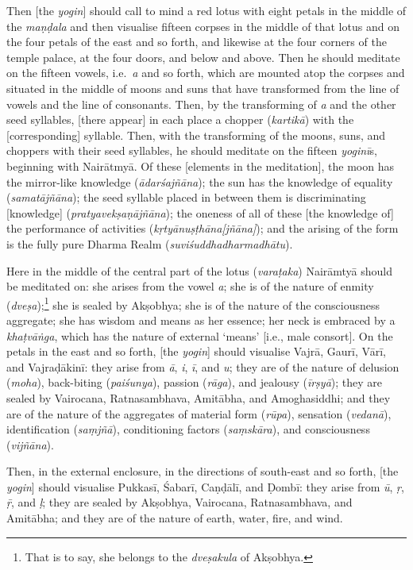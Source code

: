 \documentclass[naipra.tex]{subfiles}
\begin{document}
Then [the \emph{yogin}] should call to mind a red lotus with eight petals in the middle of the \emph{maṇḍala} and then visualise fifteen corpses in the middle of that lotus and on the four petals of the east and so forth, and likewise at the four corners of the temple palace, at the four doors, and below and above.
Then he should meditate on the fifteen vowels, i.e.\ \emph{a} and so forth, which are mounted atop the corpses and situated in the middle of moons and suns that have transformed from the line of vowels and the line of consonants.
Then, by the transforming of \emph{a} and the other seed syllables, [there appear] in each place a chopper (\emph{kartikā}) with the [corresponding] syllable.
Then, with the transforming of the moons, suns, and choppers with their seed syllables, he should meditate on the fifteen \emph{yoginī}s, beginning with Nairātmyā.
Of these [elements in the meditation], the moon has the mirror-like knowledge (\emph{ādarśajñāna}); the sun has the knowledge of equality (\emph{samatājñāna}); the seed syllable placed in between them is discriminating [knowledge] (\emph{pratyavekṣaṇājñāna}); the oneness of all of these [the knowledge of] the performance of activities (\emph{kṛtyānuṣṭhāna[jñāna]}); and the arising of the form is the fully pure Dharma Realm (\emph{suviśuddhadharmadhātu}).

Here in the middle of the central part of the lotus (\emph{varaṭaka}) Nairāmtyā should be meditated on: she arises from the vowel \emph{a}; she is of the nature of enmity (\emph{dveṣa});\footnote{
	That is to say, she belongs to the \emph{dveṣakula} of Akṣobhya.
} she is sealed by Akṣobhya; she is of the nature of the consciousness aggregate; she has wisdom and means as her essence; her neck is embraced by a \emph{khaṭvāṅga}, which has the nature of external `means' [i.e., male consort].
On the petals in the east and so forth, [the \emph{yogin}] should visualise Vajrā, Gaurī, Vārī, and Vajraḍākinī: they arise from \emph{ā}, \emph{i}, \emph{ī}, and \emph{u}; they are of the nature of delusion (\emph{moha}), back-biting (\emph{paiśunya}), passion (\emph{rāga}), and jealousy (\emph{īrṣyā}); they are sealed by Vairocana, Ratnasambhava, Amitābha, and Amoghasiddhi; and they are of the nature of the aggregates of material form (\emph{rūpa}), sensation (\emph{vedanā}), identification (\emph{saṃjñā}), conditioning factors (\emph{saṃskāra}), and consciousness (\emph{vijñāna}).

Then, in the external enclosure, in the directions of south-east and so forth, [the \emph{yogin}] should visualise Pukkasī, Śabarī, Caṇḍālī, and Ḍombī: they arise from \emph{ū}, \emph{ṛ}, \emph{ṝ}, and \emph{ḷ}; they are sealed by Akṣobhya, Vairocana, Ratnasambhava, and Amitābha; and they are of the nature of earth, water, fire, and wind.
\end{document}
